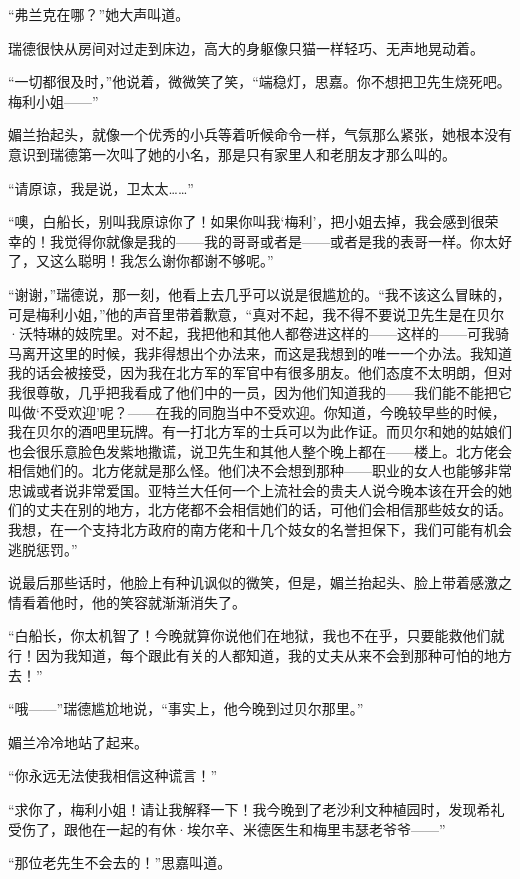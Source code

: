 \par “弗兰克在哪？”她大声叫道。
\par 瑞德很快从房间对过走到床边，高大的身躯像只猫一样轻巧、无声地晃动着。
\par “一切都很及时，”他说着，微微笑了笑，“端稳灯，思嘉。你不想把卫先生烧死吧。梅利小姐——”
\par 媚兰抬起头，就像一个优秀的小兵等着听候命令一样，气氛那么紧张，她根本没有意识到瑞德第一次叫了她的小名，那是只有家里人和老朋友才那么叫的。
\par “请原谅，我是说，卫太太……”
\par “噢，白船长，别叫我原谅你了！如果你叫我‘梅利’，把小姐去掉，我会感到很荣幸的！我觉得你就像是我的——我的哥哥或者是——或者是我的表哥一样。你太好了，又这么聪明！我怎么谢你都谢不够呢。”
\par “谢谢，”瑞德说，那一刻，他看上去几乎可以说是很尴尬的。“我不该这么冒昧的，可是梅利小姐，”他的声音里带着歉意，“真对不起，我不得不要说卫先生是在贝尔·沃特琳的妓院里。对不起，我把他和其他人都卷进这样的——这样的——可我骑马离开这里的时候，我非得想出个办法来，而这是我想到的唯一一个办法。我知道我的话会被接受，因为我在北方军的军官中有很多朋友。他们态度不太明朗，但对我很尊敬，几乎把我看成了他们中的一员，因为他们知道我的——我们能不能把它叫做‘不受欢迎’呢？——在我的同胞当中不受欢迎。你知道，今晚较早些的时候，我在贝尔的酒吧里玩牌。有一打北方军的士兵可以为此作证。而贝尔和她的姑娘们也会很乐意脸色发紫地撒谎，说卫先生和其他人整个晚上都在——楼上。北方佬会相信她们的。北方佬就是那么怪。他们决不会想到那种——职业的女人也能够非常忠诚或者说非常爱国。亚特兰大任何一个上流社会的贵夫人说今晚本该在开会的她们的丈夫在别的地方，北方佬都不会相信她们的话，可他们会相信那些妓女的话。我想，在一个支持北方政府的南方佬和十几个妓女的名誉担保下，我们可能有机会逃脱惩罚。”
\par 说最后那些话时，他脸上有种讥讽似的微笑，但是，媚兰抬起头、脸上带着感激之情看着他时，他的笑容就渐渐消失了。
\par “白船长，你太机智了！今晚就算你说他们在地狱，我也不在乎，只要能救他们就行！因为我知道，每个跟此有关的人都知道，我的丈夫从来不会到那种可怕的地方去！”
\par “哦——”瑞德尴尬地说，“事实上，他今晚到过贝尔那里。”
\par 媚兰冷冷地站了起来。
\par “你永远无法使我相信这种谎言！”
\par “求你了，梅利小姐！请让我解释一下！我今晚到了老沙利文种植园时，发现希礼受伤了，跟他在一起的有休·埃尔辛、米德医生和梅里韦瑟老爷爷——”
\par “那位老先生不会去的！”思嘉叫道。
